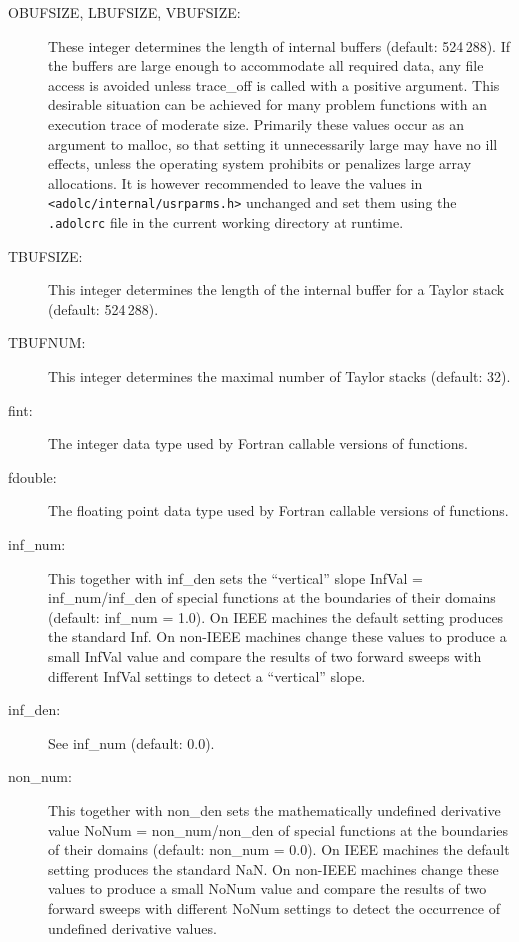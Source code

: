 \documentclass[11pt,twoside]{article}
\begin{document}
\begin{description}
\item[{\sf OBUFSIZE}, {\sf LBUFSIZE}, {\sf VBUFSIZE}{\rm :}] These integer determines the length of
in\-ter\-nal buf\-fers (default: 524$\,$288). If the buffers are large enough to accommodate all
required data, any file access is avoided unless {\sf trace\_off}
is called with a positive argument. This desirable situation can
be achieved for many problem functions with an execution trace of moderate
size. Primarily these values occur as an argument 
to {\sf malloc}, so that setting it unnecessarily large may have no
ill effects, unless the operating system prohibits or penalizes large
array allocations. It is however recommended to leave the values in
\texttt{<adolc/internal/usrparms.h>} unchanged and set them using the
\texttt{.adolcrc} file in the current working directory at runtime.

\item[{\sf TBUFSIZE}{\rm :}] This integer determines the length of the 
in\-ter\-nal buf\-fer for a Taylor stack (default: 524$\,$288).

\item[{\sf TBUFNUM}{\rm :}] This integer determines the maximal number of Taylor stacks (default: 32).

\item[{\sf fint}{\rm :}] The integer data type used by Fortran callable versions of functions.

\item[{\sf fdouble}{\rm :}] The floating point data type used by Fortran callable versions of functions.

\item[{\sf inf\_num}{\rm :}] This together with {\sf inf\_den}
sets the ``vertical'' slope {\sf InfVal} = {\sf inf\_num/inf\_den}  
of special functions at the boundaries of their domains (default: {\sf inf\_num} = 1.0). On IEEE machines 
the default setting produces the standard {\sf Inf}. On non-IEEE machines
change these values to produce a small {\sf InfVal} value and compare
the results of two forward sweeps with different {\sf InfVal} settings
to detect a ``vertical'' slope.

\item[{\sf inf\_den}{\rm :}] See {\sf inf\_num} (default: 0.0).

\item[{\sf non\_num}{\rm :}] This together with {\sf non\_den} 
sets the mathematically 
undefined derivative value {\sf NoNum} = {\sf non\_num/non\_den}
of special functions at the boundaries of their domains (default: {\sf non\_num} = 0.0). On IEEE machines
the default setting produces the standard {\sf NaN}. On non-IEEE machines
change these values to produce a small {\sf NoNum} value and compare
the results of two forward sweeps with different {\sf NoNum} settings
to detect the occurrence of undefined derivative values.


\end{description}
\end{document}
